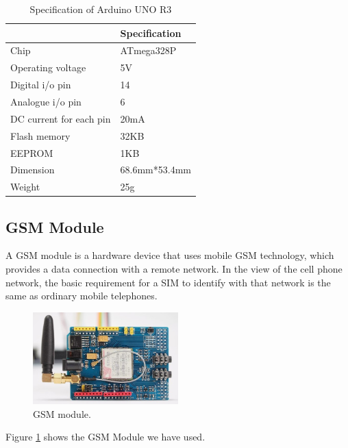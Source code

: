 \begin{table}[H]
\centering
\caption{Specification of Arduino UNO R3}
\begin{tabular}{|l|l|}
\hline
\multicolumn{1}{|c|}{\cellcolor[HTML]{FFFFFF}{\color[HTML]{333333} \textbf{Characteristics}}} & \textbf{Specification} \\ \hline
Chip                                                                                    & ATmega328P             \\ \hline
Operating voltage                                                                       & 5V                     \\ \hline
Digital i/o pin                                                                         & 14                     \\ \hline
Analogue i/o pin                                                                        & 6                      \\ \hline
DC current for each pin                                                                 & 20mA                   \\ \hline
Flash memory                                                                            & 32KB                   \\ \hline
EEPROM                                                                                  & 1KB                    \\ \hline
Dimension                                                                               & 68.6mm*53.4mm          \\ \hline
Weight                                                                                  & 25g                    \\ \hline
\end{tabular}
\end{table}





\subsection{GSM Module}
A GSM module is a hardware device that uses mobile GSM technology, which provides a data connection with a remote network. In the view of the cell phone network, the basic requirement for a SIM to identify with that network is the same as ordinary mobile telephones.
\begin{figure}[h]
\centering
\includegraphics[width=0.5\textwidth]{figures/gsm_module.jpg}
\caption{GSM module.}
\label{GSM}
\end{figure}
Figure \ref{GSM} shows the GSM Module we have used.
\vspace{1cm}


